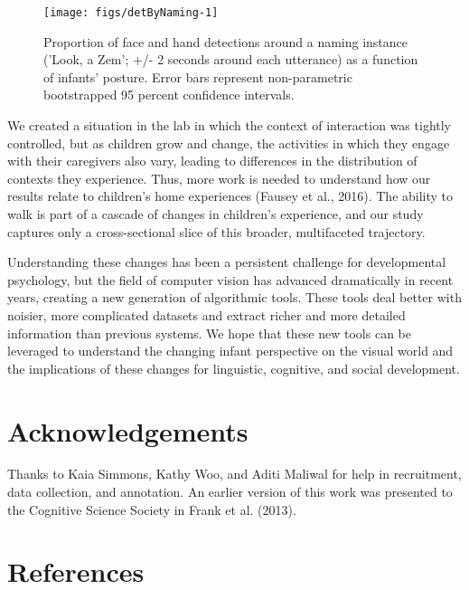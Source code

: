 \documentclass[10pt, letterpaper]{article}
\newenvironment{CodeChunk}{}{}
\begin{document}
\begin{CodeChunk}
\begin{figure}[H]

{\centering \texttt{[image: figs/detByNaming-1]} 

}

\caption[Proportion of face and hand detections around a naming instance ('Look, a Zem']{Proportion of face and hand detections around a naming instance ('Look, a Zem'; +/- 2 seconds around each utterance) as a function of infants' posture. Error bars represent non-parametric bootstrapped 95 percent confidence intervals.}\label{fig:detByNaming}
\end{figure}
\end{CodeChunk}

We created a situation in the lab in which the context of interaction
was tightly controlled, but as children grow and change, the activities
in which they engage with their caregivers also vary, leading to
differences in the distribution of contexts they experience. Thus, more
work is needed to understand how our results relate to children's home
experiences (Fausey et al., 2016). The ability to walk is part of a
cascade of changes in children's experience, and our study captures only
a cross-sectional slice of this broader, multifaceted trajectory.

Understanding these changes has been a persistent challenge for
developmental psychology, but the field of computer vision has advanced
dramatically in recent years, creating a new generation of algorithmic
tools. These tools deal better with noisier, more complicated datasets
and extract richer and more detailed information than previous systems.
We hope that these new tools can be leveraged to understand the changing
infant perspective on the visual world and the implications of these
changes for linguistic, cognitive, and social development.

\section{Acknowledgements}\label{acknowledgements}

Thanks to Kaia Simmons, Kathy Woo, and Aditi Maliwal for help in
recruitment, data collection, and annotation. An earlier version of this
work was presented to the Cognitive Science Society in Frank et al.
(2013).

\section{References}\label{references}
\end{document}
